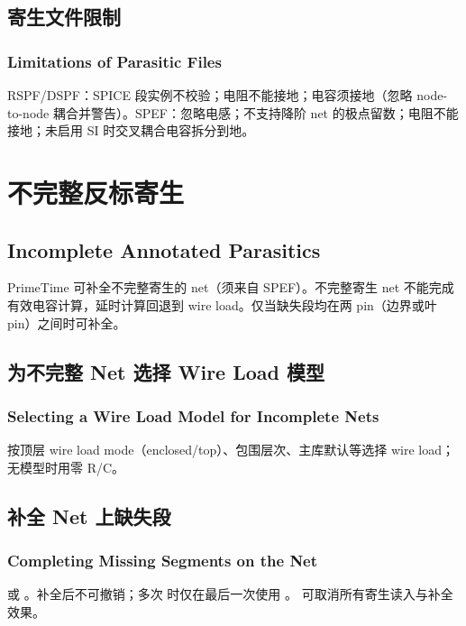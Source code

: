 \subsection{寄生文件限制}
\subsubsection*{Limitations of Parasitic Files}

RSPF/DSPF：SPICE 段实例不校验；电阻不能接地；电容须接地（忽略 node-to-node 耦合并警告）。SPEF：忽略电感；不支持降阶 net 的极点留数；电阻不能接地；未启用 SI 时交叉耦合电容拆分到地。

\section{不完整反标寄生}
\subsection*{Incomplete Annotated Parasitics}

PrimeTime 可补全不完整寄生的 net（须来自 SPEF）。不完整寄生 net 不能完成有效电容计算，延时计算回退到 wire load。仅当缺失段均在两 pin（边界或叶 pin）之间时可补全。

\subsection{为不完整 Net 选择 Wire Load 模型}
\subsubsection*{Selecting a Wire Load Model for Incomplete Nets}

按顶层 wire load mode（enclosed/top）、包围层次、主库默认等选择 wire load； 无模型时用零 R/C。

\subsection{补全 Net 上缺失段}
\subsubsection*{Completing Missing Segments on the Net}

 或 。补全后不可撤销；多次  时仅在最后一次使用 。 可取消所有寄生读入与补全效果。

